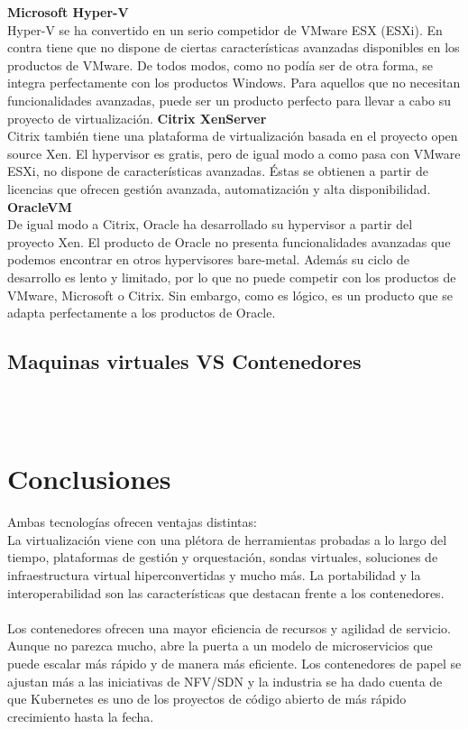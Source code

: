 \documentclass[twoside,twocolumn]{article}
\begin{document}
\begin{flushright}
\begin{itemize}
\textbf{Microsoft Hyper-V}\\
Hyper-V se ha convertido en un serio competidor de VMware ESX (ESXi). En contra tiene que no dispone de ciertas características avanzadas disponibles en los productos de VMware. De todos modos, como no podía ser de otra forma, se integra perfectamente con los productos Windows. Para aquellos que no necesitan funcionalidades avanzadas, puede ser un producto perfecto para llevar a cabo su proyecto de virtualización.\newline
\textbf{Citrix XenServer}\\
Citrix también tiene una plataforma de virtualización basada en el proyecto open source Xen. El hypervisor es gratis, pero de igual modo a como pasa con VMware ESXi, no dispone de características avanzadas. Éstas se obtienen a partir de licencias que ofrecen gestión avanzada, automatización y alta disponibilidad.\newline
\textbf {OracleVM}\\
De igual modo a Citrix, Oracle ha desarrollado su hypervisor a partir del proyecto Xen. El producto de Oracle no presenta funcionalidades avanzadas que podemos encontrar en otros hypervisores bare-metal. Además su ciclo de desarrollo es lento y limitado, por lo que no puede competir con los productos de VMware, Microsoft o Citrix. Sin embargo, como es lógico, es un producto que se adapta perfectamente a los productos de Oracle.\newline


\subsection{Maquinas virtuales VS Contenedores}
\textbf{}\\
\textbf{}\\



\section{Conclusiones}

Ambas tecnologías ofrecen ventajas distintas:
\textbf{}\\
La virtualización viene con una plétora de herramientas probadas a lo largo del tiempo, plataformas de gestión y orquestación, sondas virtuales, soluciones de infraestructura virtual hiperconvertidas y mucho más. La portabilidad y la interoperabilidad son las características que destacan frente a los contenedores.
\textbf{}\\
\textbf{}\\
Los contenedores ofrecen una mayor eficiencia de recursos y agilidad de servicio. Aunque no parezca mucho, abre la puerta a un modelo de microservicios que puede escalar más rápido y de manera más eficiente. Los contenedores de papel se ajustan más a las iniciativas de NFV/SDN y la industria se ha dado cuenta de que Kubernetes es uno de los proyectos de código abierto de más rápido crecimiento hasta la fecha.





\end{itemize}
\end{flushright}
\end{document}
